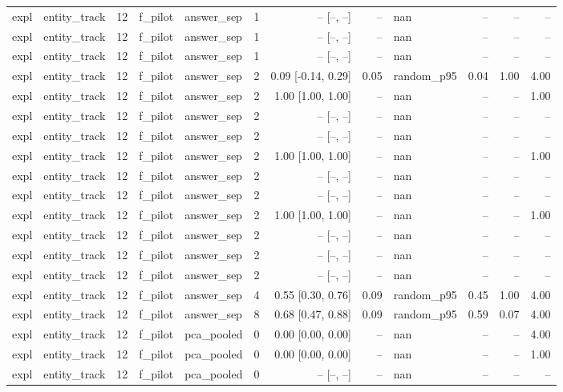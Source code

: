 \begin{tabular}{llrllrrrlrrr}
expl & entity\_track & 12 & f\_pilot & answer\_sep & 1 & -- [--, --] & -- & nan & -- & -- & -- \\
expl & entity\_track & 12 & f\_pilot & answer\_sep & 1 & -- [--, --] & -- & nan & -- & -- & -- \\
expl & entity\_track & 12 & f\_pilot & answer\_sep & 1 & -- [--, --] & -- & nan & -- & -- & -- \\
expl & entity\_track & 12 & f\_pilot & answer\_sep & 2 & 0.09 [-0.14, 0.29] & 0.05 & random\_p95 & 0.04 & 1.00 & 4.00 \\
expl & entity\_track & 12 & f\_pilot & answer\_sep & 2 & 1.00 [1.00, 1.00] & -- & nan & -- & -- & 1.00 \\
expl & entity\_track & 12 & f\_pilot & answer\_sep & 2 & -- [--, --] & -- & nan & -- & -- & -- \\
expl & entity\_track & 12 & f\_pilot & answer\_sep & 2 & -- [--, --] & -- & nan & -- & -- & -- \\
expl & entity\_track & 12 & f\_pilot & answer\_sep & 2 & 1.00 [1.00, 1.00] & -- & nan & -- & -- & 1.00 \\
expl & entity\_track & 12 & f\_pilot & answer\_sep & 2 & -- [--, --] & -- & nan & -- & -- & -- \\
expl & entity\_track & 12 & f\_pilot & answer\_sep & 2 & -- [--, --] & -- & nan & -- & -- & -- \\
expl & entity\_track & 12 & f\_pilot & answer\_sep & 2 & 1.00 [1.00, 1.00] & -- & nan & -- & -- & 1.00 \\
expl & entity\_track & 12 & f\_pilot & answer\_sep & 2 & -- [--, --] & -- & nan & -- & -- & -- \\
expl & entity\_track & 12 & f\_pilot & answer\_sep & 2 & -- [--, --] & -- & nan & -- & -- & -- \\
expl & entity\_track & 12 & f\_pilot & answer\_sep & 2 & -- [--, --] & -- & nan & -- & -- & -- \\
expl & entity\_track & 12 & f\_pilot & answer\_sep & 4 & 0.55 [0.30, 0.76] & 0.09 & random\_p95 & 0.45 & 1.00 & 4.00 \\
expl & entity\_track & 12 & f\_pilot & answer\_sep & 8 & 0.68 [0.47, 0.88] & 0.09 & random\_p95 & 0.59 & 0.07 & 4.00 \\
expl & entity\_track & 12 & f\_pilot & pca\_pooled & 0 & 0.00 [0.00, 0.00] & -- & nan & -- & -- & 4.00 \\
expl & entity\_track & 12 & f\_pilot & pca\_pooled & 0 & 0.00 [0.00, 0.00] & -- & nan & -- & -- & 1.00 \\
expl & entity\_track & 12 & f\_pilot & pca\_pooled & 0 & -- [--, --] & -- & nan & -- & -- & -- \\

\end{tabular}

